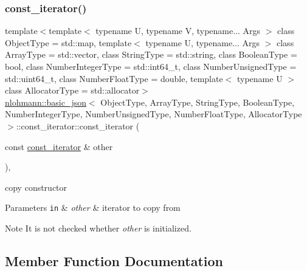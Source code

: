 \subsubsection{\texorpdfstring{const\+\_\+iterator()}{const\_iterator()}\hspace{0.1cm}{\footnotesize\ttfamily [3/3]}}
{\footnotesize\ttfamily template$<$template$<$ typename U, typename V, typename... Args $>$ class Object\+Type = std\+::map, template$<$ typename U, typename... Args $>$ class Array\+Type = std\+::vector, class String\+Type  = std\+::string, class Boolean\+Type  = bool, class Number\+Integer\+Type  = std\+::int64\+\_\+t, class Number\+Unsigned\+Type  = std\+::uint64\+\_\+t, class Number\+Float\+Type  = double, template$<$ typename U $>$ class Allocator\+Type = std\+::allocator$>$ \\
\hyperlink{classnlohmann_1_1basic__json}{nlohmann\+::basic\+\_\+json}$<$ Object\+Type, Array\+Type, String\+Type, Boolean\+Type, Number\+Integer\+Type, Number\+Unsigned\+Type, Number\+Float\+Type, Allocator\+Type $>$\+::const\+\_\+iterator\+::const\+\_\+iterator (\begin{DoxyParamCaption}\item[{const \hyperlink{classnlohmann_1_1basic__json_1_1const__iterator}{const\+\_\+iterator} \&}]{other }\end{DoxyParamCaption})\hspace{0.3cm}{\ttfamily [inline]}, {\ttfamily [noexcept]}}



copy constructor 


\begin{DoxyParams}[1]{Parameters}
\mbox{\tt in}  & {\em other} & iterator to copy from \\
\hline
\end{DoxyParams}
\begin{DoxyNote}{Note}
It is not checked whether {\itshape other} is initialized. 
\end{DoxyNote}


\subsection{Member Function Documentation}
\hypertarget{classnlohmann_1_1basic__json_1_1const__iterator_a0e717ab658d27f646a3c8602cac91d83}{}\label{classnlohmann_1_1basic__json_1_1const__iterator_a0e717ab658d27f646a3c8602cac91d83} 
